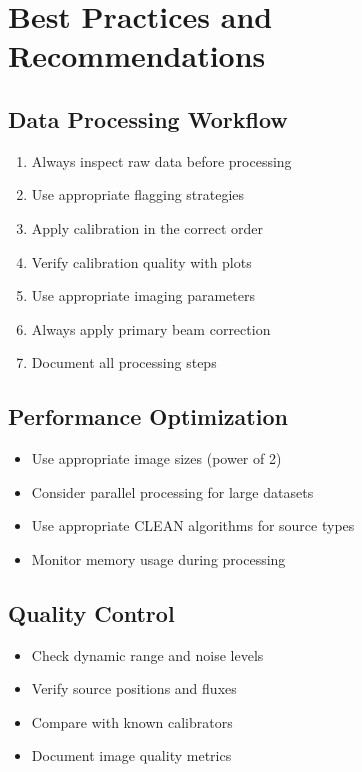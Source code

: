 \documentclass[11pt]{article}
\begin{document}
\section{Best Practices and Recommendations}

\subsection{Data Processing Workflow}
\begin{enumerate}
    \item Always inspect raw data before processing
    \item Use appropriate flagging strategies
    \item Apply calibration in the correct order
    \item Verify calibration quality with plots
    \item Use appropriate imaging parameters
    \item Always apply primary beam correction
    \item Document all processing steps
\end{enumerate}

\subsection{Performance Optimization}
\begin{itemize}
    \item Use appropriate image sizes (power of 2)
    \item Consider parallel processing for large datasets
    \item Use appropriate CLEAN algorithms for source types
    \item Monitor memory usage during processing
\end{itemize}

\subsection{Quality Control}
\begin{itemize}
    \item Check dynamic range and noise levels
    \item Verify source positions and fluxes
    \item Compare with known calibrators
    \item Document image quality metrics
\end{itemize}
\end{document}

